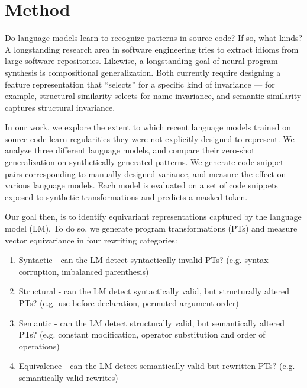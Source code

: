 \documentclass[sigconf,review,anonymous]{acmart}
\begin{document}

  \section{Method}\label{sec:method}



  Do language models learn to recognize patterns in source code? If so, what kinds? A longstanding research area in software engineering tries to extract idioms from large software repositories. Likewise, a longstanding goal of neural program synthesis is compositional generalization. Both currently require designing a feature representation that “selects” for a specific kind of invariance — for example, structural similarity selects for name-invariance, and semantic similarity captures structural invariance.

  In our work, we explore the extent to which recent language models trained on source code learn regularities they were not explicitly designed to represent. We analyze three different language models, and compare their zero-shot generalization on synthetically-generated patterns. We generate code snippet pairs corresponding to manually-designed variance, and measure the effect on various language models. Each model is evaluated on a set of code snippets exposed to synthetic transformations and predicts a masked token.

  Our goal then, is to identify equivariant representations captured by the language model (LM). To do so, we generate program transformations (PTs) and measure vector equivariance in four rewriting categories:

  \begin{enumerate}
    \item Syntactic - can the LM detect syntactically invalid PTs? (e.g. syntax corruption, imbalanced parenthesis)
    \item Structural - can the LM detect syntactically valid, but structurally altered PTs? (e.g. use before declaration, permuted argument order)
    \item Semantic - can the LM detect structurally valid, but semantically altered PTs? (e.g. constant modification, operator substitution and order of operations)
    \item Equivalence - can the LM detect semantically valid but rewritten PTs? (e.g. semantically valid rewrites)
  \end{enumerate}
\end{document}
